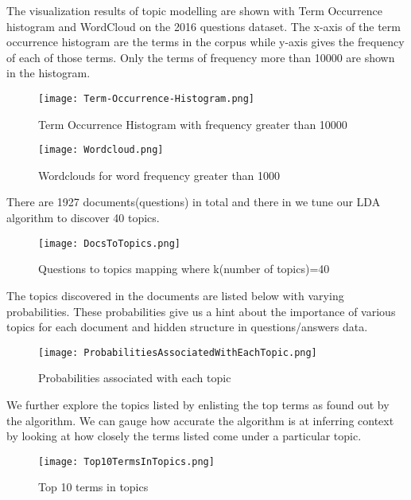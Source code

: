 \documentclass[journal]{IEEEtran}
\begin{document}
\noindent The visualization results of topic modelling are shown with Term Occurrence histogram and WordCloud on the 2016 questions dataset. The x-axis of the term occurrence histogram are the terms in the corpus while y-axis gives the frequency of each of those terms. Only the terms of frequency more than 10000 are shown in the histogram.
\begin{figure}[!htb]
\begin{center}
\texttt{[image: Term-Occurrence-Histogram.png]}
\end{center}
\caption{Term Occurrence Histogram with frequency greater than 10000}
\end{figure}

\begin{figure}[!htb]
\begin{center}
\texttt{[image: Wordcloud.png]}
\end{center}
\caption{Wordclouds for word frequency greater than 1000}
\end{figure}

\noindent There are 1927 documents(questions) in total and there in we tune our LDA algorithm to discover 40 topics.
\begin{figure}[!htb]
\begin{center}
\texttt{[image: DocsToTopics.png]}
\end{center}
\caption{Questions to topics mapping where k(number of topics)=40 }
\end{figure}

\noindent The topics discovered in the documents are listed below with varying probabilities. These probabilities give us a hint about the importance of various topics for each document and hidden structure in questions/answers data.
\begin{figure}[!htb]
\begin{center}
\texttt{[image: ProbabilitiesAssociatedWithEachTopic.png]}
\end{center}
\caption{Probabilities associated with each topic }
\end{figure}

\noindent We further explore the topics listed by enlisting the top terms as found out by the algorithm. We can gauge how accurate the algorithm is at inferring context by looking at how closely the terms listed come under a particular topic.
\begin{figure}[!htb]
\begin{center}
\texttt{[image: Top10TermsInTopics.png]}
\end{center}
\caption{Top 10 terms in topics}
\end{figure}
\end{document}
